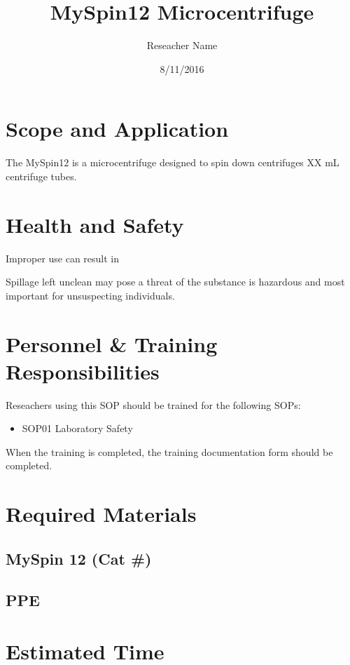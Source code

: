 \documentclass[12pt]{../SOP2}
\title{MySpin12 Microcentrifuge}
\date{8/11/2016}
\author{Reseacher Name}
\begin{document}


\maketitle

\section{Scope and Application}

\NP The MySpin12 is a microcentrifuge designed to spin down centrifuges XX mL centrifuge tubes.

\NP \lipsum[1]

\section{Health and Safety}

\NP Improper use can result in 

\NP Spillage left unclean may pose a threat of the substance is hazardous and most important for unsuspecting individuals.


\section{Personnel \& Training Responsibilities}

\NP Reseachers using this SOP should be trained for the following SOPs:

\begin{itemize}
  \item SOP01 Laboratory Safety
\end{itemize}

When the training is completed, the training documentation form should be completed.

\section{Required Materials}

\subsection{MySpin 12 (Cat \#)}
\subsection{PPE}

\section{Estimated Time}
\end{document}
